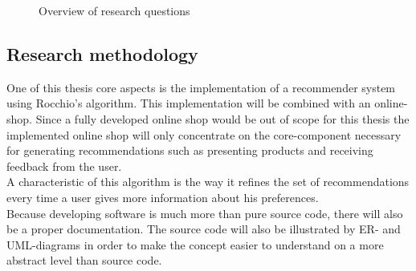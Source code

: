 \begin{figure}[h!]

    \caption{Overview of research questions}
    \label{fig:research-questions}

\end{figure}





\subsection{Research methodology}
One of this thesis core aspects is the implementation of a recommender system using Rocchio's algorithm.
This implementation will be combined with an online-shop.
Since a fully developed online shop would be out of scope for this thesis the implemented online shop will only concentrate on the core-component necessary for generating recommendations such as presenting products and receiving feedback from the user.\\
A characteristic of this algorithm is the way it refines the set of recommendations every time a user gives more information about his preferences.\citep[p. 92]{lops:2011}
\\
Because developing software is much more than pure source code, there will also be a proper documentation.
The source code will also be illustrated by ER- and UML-diagrams in order to make the concept easier to understand on a more abstract level than source code.

